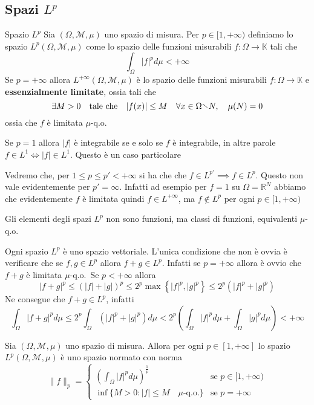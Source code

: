 \subsection{Spazi \(L^{p}\) }
\begin{definition}{Spazio \(L^{p}\)}
    Sia \((\Omega, \mathcal{M}, \mu)\) uno spazio di misura. Per \(p \in [1,
    +\infty)\) definiamo lo spazio \(L^{p}(\Omega, \mathcal{M}, \mu)\) come lo
    spazio delle funzioni misurabili \(f : \Omega \to \mathbb{K}\) tali che
    \[
    \int_{\Omega} |f|^{p} d\mu < +\infty
    \]
    Se \(p = +\infty\) allora \(L^{+\infty}(\Omega, \mathcal{M}, \mu)\) è lo
    spazio delle funzioni misurabili \(f : \Omega \to \mathbb{K}\) e
    \textbf{essenzialmente limitate}, ossia tali che
    \[
        \exists M > 0 \quad \text{tale che} \quad |f(x)| \le M \quad
        \forall x \in \Omega \sminus N, \quad \mu(N) = 0
    \]
    ossia che \(f\) è limitata \(\mu\)-q.o.
\end{definition}
\begin{note}
    Se \(p=1\) allora \(|f|\) è integrabile se e solo se \(f\) è integrabile, in
    altre parole \(f \in L^{1} \iff |f| \in L^{1}\). Questo è un caso
    particolare
\end{note}
\begin{note}
    Vedremo che, per \(1 \le p \le p' < +\infty\) si ha che che \(f \in L^{p'}
    \implies f \in L^{p}\). Questo non vale evidentemente per \(p' = \infty\).
    Infatti ad esempio per \(f = 1\) su \(\Omega = \mathbb{R}^{N}\) abbiamo che
    evidentemente \(f\) è limitata quindi \(f \in L^{+\infty}\), ma \(f \notin
    L^{p}\) per ogni \(p \in [1, +\infty)\) 
\end{note}
Gli elementi degli spazi \(L^{p}\) non sono funzioni, ma classi di funzioni,
equivalenti \(\mu\)-q.o.
\begin{remark}
    Ogni spazio \(L^{p}\) è uno spazio vettoriale. L'unica condizione che non è
    ovvia è verificare che se \(f, g \in L^{p}\) allora \(f+g \in L^{p}\).
    Infatti se \(p = +\infty\) allora è ovvio che \(f+g\) è limitata
    \(\mu\)-q.o.~Se \(p < +\infty\) allora 
    \[
    |f+g|^{p} \le {(|f| + |g|)}^{p} \le 2^{p}
    \max \left\{ |f|^{p}, |g|^{p} \right\} \le 2^{p} (|f|^{p} + |g|^{p})
    \]
    Ne consegue che \(f+g \in L^{p}\), infatti
    \[
        \int_{\Omega} |f+g|^{p} d\mu \le 2^{p} \int_{\Omega} (|f|^{p} + |g|^{p})
        d\mu < 2^{p} {\left( \int_\Omega |f|^{p} d\mu + \int_\Omega |g|^{p} d\mu
        \right)} < +\infty
    \]
\end{remark}
\begin{proposition}\label{prp:spazio-Lp-normato}
    Sia \((\Omega, \mathcal{M}, \mu)\) uno spazio di misura. Allora per ogni
    \(p \in [1, +\infty]\) lo spazio \(L^{p}(\Omega, \mathcal{M}, \mu)\) è uno
    spazio normato con norma
    \[
        \|f\|_p = 
        \begin{cases}
            \displaystyle
            {\left( \int_{\Omega} |f|^{p} d\mu
            \right)}^{\frac{1}{p}} & \text{se } p \in [1, +\infty) \\
            \inf \{M > 0 : |f| \le M \quad \mu\text{-q.o.} \} & \text{se } p = +\infty
        \end{cases}
    \]
\end{proposition}
